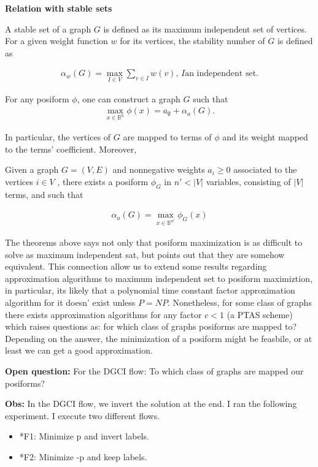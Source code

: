 \textbf{Relation with stable sets}

A stable set of a graph $G$ is defined as its maximum independent set of vertices. For a given weight function $w$ for its vertices, the stability number of $G$ is defined as

\begin{align*}
	\alpha_w(G) = \max_{I \in V}\sum_{v \in I} w(v),\, I \text{an independent set}.
\end{align*} 

\begin{theorem}{}
For any posiform $\phi$, one can construct a graph $G$ such that
\begin{align*}
\max_{x \in \mathbb{B}^n}{\phi(x)} = a_{\emptyset} + \alpha_{a}(G).
\end{align*}
\end{theorem}

In particular, the vertices of $G$ are mapped to terms of $\phi$ and its weight mapped to the terms' coefficient. Moreover,

\begin{theorem}{}
Given a graph $G = (V, E)$ and nonnegative weights $a_i \geq 0$
associated to the vertices $i \in V$ , there exists a posiform $\phi_G$  in $n' < |V| $ variables, consisting of $|V|$ terms, and such that

\begin{align*}
	\alpha_a(G) = \max_{x \in \mathbb{B}^{n'} } \phi_G(x)
\end{align*}
\end{theorem}

The theorems above says not only that posiform maximization is as difficult to solve as maximum independent sat, but points out that they are somehow equivalent. This connection allow us to extend some results regarding approximation algorithms to maximum independent set to posiform maximiztion, in particular, its likely that a polynomial time constant factor approximation algorithm for it doesn' exist unless $P=NP$. Nonetheless, for some class of graphs there exists approximation algorithms for any factor $c<1$ (a PTAS scheme) which raises questions as: for which class of graphs posiforms are mapped to? Depending on the answer, the minimization of a posiform might be feasbile, or at least we can get a good approximation.

\textbf{Open question:} For the DGCI flow: To which class of graphs are mapped our posiforms? 

\textbf{Obs:} In the DGCI flow, we invert the solution at the end. I ran the following experiment. I execute two different flows. 
\begin{itemize}
	\item{*}{F1: Minimize p and invert labels.}
	\item{*}{F2: Minimize -p and keep labels.}	
\end{itemize}

